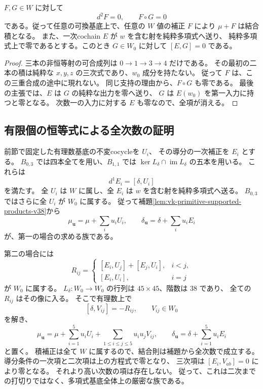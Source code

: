 \begin{lemma}[原始射に支持を持つ積補正]
\label{lem:vk-primitive-supported-products-v38}
$F,G\in W$ に対して
\[
 d^2F=0,\qquad F\circ G=0
\]
である。従って任意の可換基底上で、任意の $W$ 値の補正 $F$ により
$\mu+F$ は結合積となる。
また、一次cochain $E$ が $w$ を含む射を純粋多項式へ送り、
純粋多項式上で零であるとする。このとき $G\in W_0$ に対して
$[E,G]=0$ である。
\end{lemma}

\begin{proof}
三本の非恒等射の可合成列は $0\to1\to3\to4$ だけである。
その最初の二本の積は純粋な $x,y,z$ の三次式であり、$w_0$ 成分を持たない。
従って $F$ は、この三重合成の途中に現れない。
同じ支持の理由から、$F\circ G$ も零である。
最後の主張では、$E$ は $G$ の純粋な出力を零へ送り、
$G$ は $E(w_0)$ を第一入力に持つと零となる。
次数一の入力に対する $E$ も零なので、全項が消える。
\end{proof}

\subsection{有限個の恒等式による全次数の証明}

前節で固定した有理数基底の不変cocycleを $U_i$、
その導分の一次補正を $E_i$ とする。
$B_{0,3}$ では四本全てを用い、$B_{1,1}$ では
$\ker L_\delta\cap\operatorname{im}L_\delta$ の五本を用いる。
これらは
\[
 d^1E_i=[\delta,U_i]
\]
を満たす。
全 $U_i$ は $W$ に属し、全 $E_i$ は $w$ を含む射を純粋多項式へ送る。
$B_{0,3}$ ではさらに全 $U_i$ が $W_0$ に属する。
従って補題\ref{lem:vk-primitive-supported-products-v38}から
\[
 \mu_{\boldsymbol u}=\mu+\sum_i u_iU_i,
 \qquad
 \delta_{\boldsymbol u}=\delta+\sum_i u_iE_i
\]
が、第一の場合の求める族である。

第二の場合には
\[
 R_{ij}=
 \begin{cases}
 [E_i,U_j]+[E_j,U_i],&i<j,\\
 [E_i,U_i],&i=j
 \end{cases}
\]
が $W_0$ に属する。
$L_\delta:W_0\to W_0$ の行列は $45\times45$、階数は $38$ であり、
全ての $R_{ij}$ はその像に入る。
そこで有理数上で
\[
 [\delta,V_{ij}]=-R_{ij},\qquad V_{ij}\in W_0
\]
を解き、
\begin{equation}
 \mu_{\boldsymbol u}
 =\mu+\sum_{i=1}^{5}u_iU_i
       +\sum_{1\le i\le j\le5}u_iu_jV_{ij},
 \qquad
 \delta_{\boldsymbol u}=\delta+\sum_{i=1}^{5}u_iE_i
 \label{eq:vk-exact-quadratic-family-v38}
\end{equation}
と置く。
積補正は全て $W$ に属するので、結合則は補題から全次数で成立する。
導分条件の一次項と二次項は上の方程式で零となり、
三次項は $[E_i,V_{ab}]=0$ により零となる。
それより高い次数の項は存在しない。
従って、これは二次までの打切りではなく、多項式基底全体上の厳密な族である。

